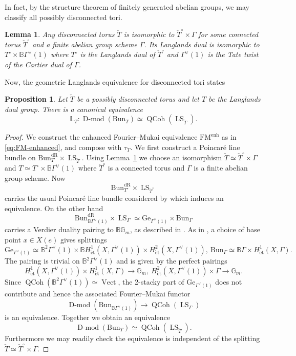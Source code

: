 \documentclass[11pt]{amsart}
\newcommand{\bG}{\mathbb{G}}
\newcommand{\B}{\mathbb{B}}
\newcommand{\et}{\mathrm{\acute{e}t}}
\newcommand{\dR}{\mathrm{dR}}
\newcommand{\Vect}{\operatorname{Vect}}
\newcommand{\Ge}{\mathrm{Ge}}
\newcommand{\Bun}{{\mathrm{Bun}}}
\DeclareMathOperator{\QCoh}{QCoh}
\DeclareMathOperator{\Dmod}{D-mod}
\DeclareMathOperator{\LS}{LS}
\newtheorem{lemma}[thm]{Lemma}
\newtheorem{prop}[thm]{Proposition}
\theoremstyle{remark}
\theoremstyle{definition}
\begin{document}
In fact, by the structure theorem of finitely generated abelian groups, we may classify all possibly disconnected tori.
\begin{lemma}\label{lem:structure-thm-disconnected-tori}
    Any disconnected torus $\check T$ is isomorphic to $\check T^\circ\times\Gamma$ for some connected torus $\check T^\circ$ and a finite abelian group scheme $\Gamma$. Its Langlands dual is isomorphic to $T^\circ\times\B\Gamma^\vee(1)$ where $T^\circ$ is the Langlands dual of $\check T^\circ$ and $\Gamma^\vee(1)$ is the Tate twist of the Cartier dual of $\Gamma$.
\end{lemma}

Now, the geometric Langlands equivalence for disconnected tori states
\begin{prop}\label{prop:GLC-disconnected}
    Let $\check T$ be a possibly disconnected torus and let $T$ be the Langlands dual group. There is a canonical equivalence
    \begin{equation}\label{eq:disconnected-tori-equivalence}
    \mathbb L_T\colon \Dmod(\Bun_T)\simeq\QCoh(\LS_{\check T}).
    \end{equation}
\end{prop}
\begin{proof}
We construct the enhanced Fourier--Mukai equivalence $\mathrm{FM}^{\mathrm{enh}}$ as in \eqref{eq:FM-enhanced}, and compose with $\tau_T$. We first construct a Poincar\'e line bundle on $\Bun_T^\dR\times\LS_{\check T}$. Using Lemma~\ref{lem:structure-thm-disconnected-tori} we choose an isomorphism $\check T\simeq\check T^\circ\times\Gamma$ and $T\simeq T^\circ\times\B\Gamma^\vee(1)$ where $\check T^\circ$ is a connected torus and $\Gamma$ is a finite abelian group scheme. Now
\[
\Bun_{T^\circ}^\dR\times\LS_{\check T^\circ}
\]
carries the usual Poincar\'e line bundle considered by \cite{laumon-fourier,rothstein} which induces an equivalence. On the other hand
\[
\Bun_{\B\Gamma^\vee(1)}^\dR\times\LS_\Gamma\simeq\Ge_{\Gamma^\vee(1)}\times\Bun_\Gamma
\]
carries a Verdier duality pairing to $\B\bG_m$, as described in \cite[\S8.2.1]{GLC5}. As in \cite[\S8.2.4]{GLC5}, a choice of base point $x\in X(e)$ gives splittings
\[
\Ge_{\Gamma^\vee(1)}\simeq\B^2\Gamma^\vee(1)\times \B H^1_\et(X,\Gamma^\vee(1))\times H^2_\et(X,\Gamma^\vee(1)),\ \Bun_\Gamma\simeq\B\Gamma\times H^1_\et(X,\Gamma).
\]
The pairing is trivial on $\B^2\Gamma^\vee(1)$ and is given by the perfect pairings
\[ H^1_\et(X,\Gamma^\vee(1))\times H^1_\et(X,\Gamma)\to\bG_m,\ H^2_\et(X,\Gamma^\vee(1))\times \Gamma\to\bG_m.\]
Since $\QCoh(\B^2\Gamma^\vee(1))\simeq\Vect$, the 2-stacky part of $\Ge_{\Gamma^\vee(1)}$ does not contribute and hence the associated Fourier--Mukai functor
\[
\Dmod(\Bun_{\B\Gamma^\vee(1)})\to\QCoh(\LS_\Gamma)
\]
is an equivalence. Together we obtain an equivalence
\[
\Dmod(\Bun_T)\simeq\QCoh(\LS_{\check T}).
\]
Furthermore we may readily check the equivalence is independent of the splitting $\check T\simeq\check T^\circ\times\Gamma$.
\end{proof}
\end{document}
